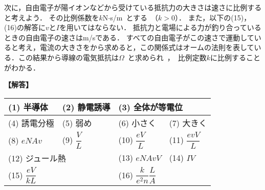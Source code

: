 次に，自由電子が陽イオンなどから受けている抵抗力の大きさは速さに比例すると考えよう．
その比例係数を$k$\unit{N$\cdot$s/m}とする（$k>0$）．
また，以下の(15)，(16)の解答に$v$と$I$を用いてはならない．
抵抗力と電場による力が釣り合っているときの自由電子の速さは\unit{m/s}である．
すべての自由電子がこの速さで運動していると考え，電流の大きさをから求めると，この関係式はオームの法則を表している．この結果から導線の電気抵抗は\unit{$\Omega$}と求められ，比例定数$k$に比例することがわかる．

\vspace{\baselineskip}

\begin{comment}

\noindent
\textbf{【解答欄】}
\begingroup
\renewcommand{\arraystretch}{2}
\begin{table}[H]
  \centering
  \begin{tabular}{|p{.2\textwidth}|p{.2\textwidth}|p{.2\textwidth}|p{.2\textwidth}|}\hline
    (1)	& (2) & \multicolumn{2}{|l|}{(3)}\\\hline
    (4) &	(5)	& (6)	& (7) \\\hline
    (8)	& (9)	& (10) & (11) \\\hline
    \multicolumn{2}{|l|}{(12)} & (13) & (14) \\\hline
    \multicolumn{2}{|l|}{(15)} &	\multicolumn{2}{|l|}{(16)}\\\hline
  \end{tabular}
\end{table}
\endgroup

\end{comment}

\noindent
\textbf{【解答】}
\begingroup
\renewcommand{\arraystretch}{2}
\begin{table}[H]
  \centering
  \begin{tabular}{|p{}|p{}|p{}|p{}|}\hline
    (1)	半導体& (2) 静電誘導& \multicolumn{2}{|l|}{(3) 全体が等電位}\\\hline
    (4) 誘電分極&	(5)	弱め& (6)	小さく& (7) 大きく\\\hline
    (8)	$eNAv$& (9)	$\dfrac{V}{L}$& (10) $\dfrac{eV}{L}$& (11) $\dfrac{evV}{L}$\\\hline
    \multicolumn{2}{|l|}{(12) ジュール熱} & (13) $eNAvV$& (14) $IV$\\\hline
    \multicolumn{2}{|l|}{(15) $\dfrac{eV}{kL}$} &	\multicolumn{2}{|l|}{(16) $\dfrac{k}{e^2n}\dfrac{L}{A}$}\\\hline
  \end{tabular}
\end{table}
\endgroup



\begin{comment}

\end{comment}


